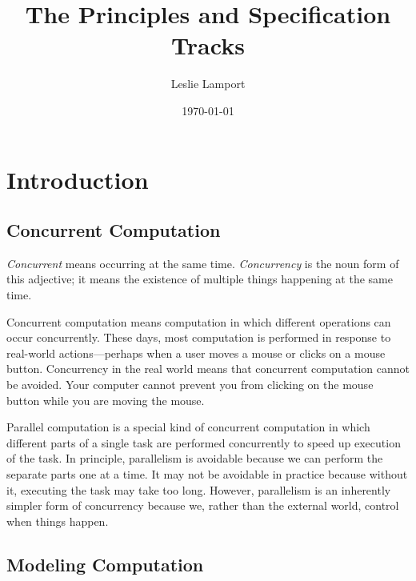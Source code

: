 \documentclass[fleqn,leqno]{article}
\title{\bf The Principles and Specification Tracks}
\author{Leslie Lamport}
\date{\today}
\begin{document}
{}
\showversions
\tableofcontents
\hideversions
\vfill
\newpage
\vspace*{-\baselineskip}
\section{Introduction}

\subsection{Concurrent Computation}

\emph{Concurrent} 
means occurring at the same time.
\emph{Concurrency} 
is the noun form of this adjective; it means the
existence of multiple things happening at the same time.

Concurrent computation means computation in which different operations
can occur concurrently.  These days, most computation is performed in
response to real-world actions---perhaps when a user moves a mouse or
clicks on a mouse button.  Concurrency in the real world means that
concurrent computation cannot be avoided.  Your computer cannot
prevent you from clicking on the mouse button while you are moving the
mouse.

Parallel computation is a special kind of concurrent computation in
which different parts of a single task are performed concurrently to
speed up execution of the task.  In principle, parallelism is
avoidable because we can perform the separate parts one at a time.  It
may not be avoidable in practice because without it, executing the
task may take too long.  However, parallelism is an inherently simpler
form of concurrency because we, rather than the external world,
control when things happen.


\subsection{Modeling Computation} \label{sec:computing-devices}
\end{document}
